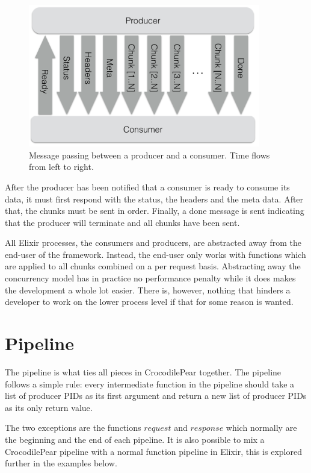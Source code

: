 \documentclass{cslthse-msc}
\begin{document}
\begin{figure}[H]
  \centering
    \begin{center}
      \includegraphics[width=0.9\textwidth]{images/crocpear_producer_consumer.png}
    \end{center}
  \caption{Message passing between a producer and a consumer. Time flows from left to right.}
\end{figure}

After the producer has been notified that a consumer is ready to consume its data, it must first respond with the status, the headers and the meta data. After that, the chunks must be sent in order. Finally, a done message is sent indicating that the producer will terminate and all chunks have been sent.

All Elixir processes, the consumers and producers, are abstracted away from the end-user of the framework. Instead, the end-user only works with functions which are applied to all chunks combined on a per request basis. Abstracting away the concurrency model has in practice no performance penalty while it does makes the development a whole lot easier. There is, however, nothing that hinders a developer to work on the lower process level if that for some reason is wanted.

\section{Pipeline}
The pipeline is what ties all pieces in CrocodilePear together. The pipeline follows a simple rule: every intermediate function in the pipeline should take a list of producer PIDs as its first argument and return a new list of producer PIDs as its only return value.

The two exceptions are the functions $request$ and $response$ which normally are the beginning and the end of each pipeline. It is also possible to mix a CrocodilePear pipeline with a normal function pipeline in Elixir, this is explored further in the examples below.
\end{document}
